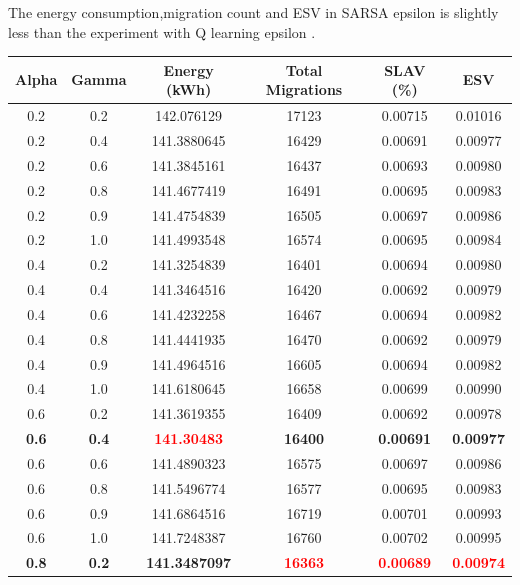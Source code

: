 \documentclass[a4paper,12pt]{Classes/RoboticsLaTeX}
\begin{document}
        The energy consumption,migration count and  ESV in SARSA epsilon is slightly less than the experiment with Q learning epsilon .

        \begin{table}[H]
        \centering
        \small
        \begin{tabular}{|c|c|c|c|c|c|}
        \hline
        \textbf{Alpha} & \textbf{Gamma} & \textbf{Energy (kWh)} & \textbf{Total Migrations} & \textbf{SLAV (\%)} & \textbf{ESV} \\ 
        \hline
        0.2 & 0.2 & 142.076129 & 17123 & 0.00715 & 0.01016 \\ 
        0.2 & 0.4 & 141.3880645 & 16429 & 0.00691 & 0.00977 \\ 
        0.2 & 0.6 & 141.3845161 & 16437 & 0.00693 & 0.00980 \\ 
        0.2 & 0.8 & 141.4677419 & 16491 & 0.00695 & 0.00983 \\ 
        0.2 & 0.9 & 141.4754839 & 16505 & 0.00697 & 0.00986 \\ 
        0.2 & 1.0 & 141.4993548 & 16574 & 0.00695 & 0.00984 \\ 
        0.4 & 0.2 & 141.3254839 & 16401 & 0.00694 & 0.00980 \\ 
        0.4 & 0.4 & 141.3464516 & 16420 & 0.00692 & 0.00979 \\ 
        0.4 & 0.6 & 141.4232258 & 16467 & 0.00694 & 0.00982 \\ 
        0.4 & 0.8 & 141.4441935 & 16470 & 0.00692 & 0.00979 \\ 
        0.4 & 0.9 & 141.4964516 & 16605 & 0.00694 & 0.00982 \\ 
        0.4 & 1.0 & 141.6180645 & 16658 & 0.00699 & 0.00990 \\ 
        0.6 & 0.2 & 141.3619355 & 16409 & 0.00692 & 0.00978 \\ 
        \textbf{0.6} & \textbf{0.4} & \textbf{\textcolor{red}{141.30483}} & \textbf{16400} & \textbf{0.00691} & \textbf{0.00977} \\ 
        0.6 & 0.6 & 141.4890323 & 16575 & 0.00697 & 0.00986 \\ 
        0.6 & 0.8 & 141.5496774 & 16577 & 0.00695 & 0.00983 \\ 
        0.6 & 0.9 & 141.6864516 & 16719 & 0.00701 & 0.00993 \\ 
        0.6 & 1.0 & 141.7248387 & 16760 & 0.00702 & 0.00995 \\ 
        \textbf{0.8} & \textbf{0.2} & \textbf{141.3487097} & \textbf{\textcolor{red}{16363}} & \textbf{\textcolor{red}{0.00689}} & \textbf{\textcolor{red}{0.00974}} \\ 

\end{tabular}
\end{table}
\end{document}
